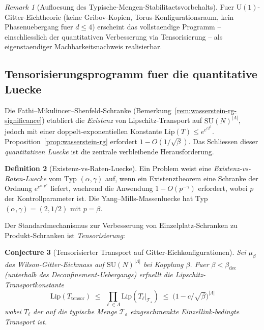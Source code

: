 \documentclass[12pt,a4paper]{article}
\theoremstyle{definition}
\newtheorem{definition}{Definition}[section]
\theoremstyle{plain}
\newtheorem{conjecture}[definition]{Conjecture}
\theoremstyle{remark}
\newtheorem{remark}[definition]{Remark}
\begin{document}
\begin{remark}[Aufloesung des Typische-Mengen-Stabilitaetsvorbehalts]
Fuer $\mathrm{U}(1)$-Gitter-Eichtheorie (keine Gribov-Kopien,
Torus-Konfigurationsraum, kein Phasenuebergang fuer $d \leq 4$)
erscheint das vollstaendige Programm -- einschliesslich der quantitativen
Verbesserung via Tensorisierung -- als eigenstaendiger Machbarkeitsnachweis realisierbar.
\end{remark}

\subsection{Tensorisierungsprogramm fuer die quantitative Luecke}\label{sec:tensorisation}

Die Fathi--Mikulincer--Shenfeld-Schranke (Bemerkung~\ref{rem:wasserstein-rg-significance})
etabliert die \emph{Existenz} von Lipschitz-Transport auf $\mathrm{SU}(N)^{|\Lambda|}$,
jedoch mit einer doppelt-exponentiellen Konstante $\mathrm{Lip}(T) \leq e^{e^{c\beta^2}}$.
Proposition~\ref{prop:wasserstein-rg} erfordert $1 - O(1/\sqrt{\beta})$.
Das Schliessen dieser \emph{quantitativen Luecke} ist die zentrale verbleibende Herausforderung.

\begin{definition}[Existenz-vs-Raten-Luecke]\label{def:evr-gap}
Ein Problem weist eine \emph{Existenz-vs-Raten-Luecke} vom Typ $(\alpha, \gamma)$
auf, wenn ein Existenztheorem eine Schranke der Ordnung $e^{e^{c \cdot p^\alpha}}$
liefert, waehrend die Anwendung $1 - O(p^{-\gamma})$ erfordert,
wobei $p$ der Kontrollparameter ist.
Die Yang--Mills-Massenluecke hat Typ $(\alpha, \gamma) = (2, 1/2)$
mit $p = \beta$.
\end{definition}

Der Standardmechanismus zur Verbesserung von Einzelplatz-Schranken zu Produkt-Schranken
ist \emph{Tensorisierung}:

\begin{conjecture}[Tensorisierter Transport auf Gitter-Eichkonfigurationen]
\label{conj:tensorisation}
Sei $\mu_\beta$ das Wilson-Gitter-Eichmass auf
$\mathrm{SU}(N)^{|\Lambda|}$ bei Kopplung $\beta$.
Fuer $\beta < \beta_{\mathrm{dec}}$ (unterhalb des Deconfinement-Uebergangs)
erfuellt die Lipschitz-Transportkonstante
\[
  \mathrm{Lip}(T_{\mathrm{tensor}}) \;\leq\;
  \prod_{\ell \in \Lambda} \mathrm{Lip}(T_\ell|_{\mathcal{T}_\varepsilon})
  \;\leq\; \bigl(1 - c/\sqrt{\beta}\bigr)^{|\Lambda|}
\]
wobei $T_\ell$ der auf die typische Menge $\mathcal{T}_\varepsilon$
eingeschraenkte Einzellink-bedingte Transport ist.
\end{conjecture}
\end{document}
